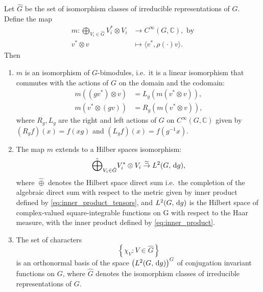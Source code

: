 \documentclass{report}
\begin{document}
\begin{theorem}
Let \( \hat{G} \) be the set of isomorphism classes of irreducible representations of \( G \). Define the map
\begin{align*}
    m : \bigoplus_{V_i \in \hat{G}} V_i^* \otimes V_i &\rightarrow C^\infty(G, \mathbb{C}), 
\text{ by}\\
    v^* \otimes v &\mapsto \langle v^*, \rho(\cdot)v \rangle.  
\end{align*}
Then
\begin{enumerate}[label = (\roman*)]
    \item $m$ is an isomorphism of \( G \)-bimodules, i.e.\ it is a linear isomorphism that commutes with the actions of \( G \) on the domain and the codomain:
    \begin{align*}
        m((gv^*) \otimes v) &= L_g(m(v^* \otimes v)),\\
        m(v^* \otimes (gv)) &= R_g(m(v^* \otimes v)),
    \end{align*}
    where $R_g, L_g$ are the right and left actions of $G$ on $C^\infty(G, \mathbb{C})$ given by $(R_g f)(x) = f(xg)$ and $(L_g f)(x) = f(g^{-1}x)$.
    \item The map $m$ extends to a Hilber spaces isomorphism:
    \[
    \hat{\bigoplus}_{V_i \in \hat{G}} V_i^* \otimes V_i \overset{\simeq}{\rightarrow} L^2(G, \,\mathrm{d} g),
    \] 
    where $\hat \oplus$ denotes the Hilbert space direct sum i.e.\ the completion of the algebraic direct sum with respect to the metric given by inner product defined by \cref{eq:inner_product_tensors}, and $L^2(G, \,\mathrm{d} g)$ is the Hilbert space of complex-valued square-integrable functions on G with respect to the Haar measure, with the inner product defined by \cref{eq:inner_product}.
    \item The set of characters 
    $$\left\{ \chi_V : V \in \hat G \right\}$$
    is an orthonormal basis of the space $\left(L^2(G, \,\mathrm{d} g)\right)^G$ of conjugation invariant functions on $G$, where $\hat G$ denotes the isomorphism classes of irreducible representations of $G$.
\end{enumerate}
\end{theorem}
\end{document}
